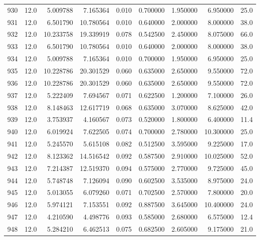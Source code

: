 \begin{tabular}{lrrrrrrrr}
930  &   12.0 &   5.009788 &   7.165364 &  0.010 &  0.700000 &  1.950000 &   6.950000 &   25.0 \\
931  &   12.0 &   6.501790 &  10.780564 &  0.010 &  0.640000 &  2.000000 &   8.000000 &   38.0 \\
932  &   12.0 &  10.233758 &  19.339919 &  0.078 &  0.542500 &  2.450000 &   8.075000 &   66.0 \\
933  &   12.0 &   6.501790 &  10.780564 &  0.010 &  0.640000 &  2.000000 &   8.000000 &   38.0 \\
934  &   12.0 &   5.009788 &   7.165364 &  0.010 &  0.700000 &  1.950000 &   6.950000 &   25.0 \\
935  &   12.0 &  10.228786 &  20.301529 &  0.060 &  0.635000 &  2.650000 &   9.550000 &   72.0 \\
936  &   12.0 &  10.228786 &  20.301529 &  0.060 &  0.635000 &  2.650000 &   9.550000 &   72.0 \\
937  &   12.0 &   5.222409 &   7.694567 &  0.071 &  0.622500 &  1.200000 &   7.100000 &   26.0 \\
938  &   12.0 &   8.148463 &  12.617719 &  0.068 &  0.635000 &  3.070000 &   8.625000 &   42.0 \\
939  &   12.0 &   3.753937 &   4.160567 &  0.073 &  0.520000 &  1.800000 &   6.400000 &   11.4 \\
940  &   12.0 &   6.019924 &   7.622505 &  0.074 &  0.700000 &  2.780000 &  10.300000 &   25.0 \\
941  &   12.0 &   5.245570 &   5.615108 &  0.082 &  0.512500 &  3.595000 &   9.225000 &   17.0 \\
942  &   12.0 &   8.123362 &  14.516542 &  0.092 &  0.587500 &  2.910000 &  10.025000 &   52.0 \\
943  &   12.0 &   7.214387 &  12.519370 &  0.094 &  0.575000 &  2.770000 &   9.725000 &   45.0 \\
944  &   12.0 &   5.748748 &   7.126094 &  0.090 &  0.602500 &  3.535000 &   8.975000 &   24.0 \\
945  &   12.0 &   5.013055 &   6.079260 &  0.071 &  0.702500 &  2.570000 &   7.800000 &   20.0 \\
946  &   12.0 &   5.974121 &   7.153551 &  0.092 &  0.887500 &  3.645000 &  10.400000 &   24.0 \\
947  &   12.0 &   4.210590 &   4.498776 &  0.093 &  0.585000 &  2.680000 &   6.575000 &   12.4 \\
948  &   12.0 &   5.284210 &   6.462513 &  0.075 &  0.682500 &  2.605000 &   9.175000 &   21.0 \\

\end{tabular}
